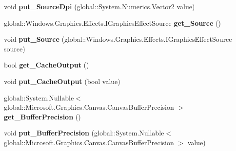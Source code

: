 \begin{DoxyCompactItemize}
void {\bfseries put\+\_\+\+Source\+Dpi} (global\+::\+System.\+Numerics.\+Vector2 value)
\item 
\mbox{\label{class_microsoft_1_1_graphics_1_1_canvas_1_1_effects_1_1_dpi_compensation_effect_ad4e3622fd4c21cbed4bbc30f5bca8e6c}} 
global\+::\+Windows.\+Graphics.\+Effects.\+I\+Graphics\+Effect\+Source {\bfseries get\+\_\+\+Source} ()
\item 
\mbox{\label{class_microsoft_1_1_graphics_1_1_canvas_1_1_effects_1_1_dpi_compensation_effect_a9757cf2afe58883b620d18466fa4301f}} 
void {\bfseries put\+\_\+\+Source} (global\+::\+Windows.\+Graphics.\+Effects.\+I\+Graphics\+Effect\+Source source)
\item 
\mbox{\label{class_microsoft_1_1_graphics_1_1_canvas_1_1_effects_1_1_dpi_compensation_effect_a7ec44257a5eb79a4b4d6ada66d09b56b}} 
bool {\bfseries get\+\_\+\+Cache\+Output} ()
\item 
\mbox{\label{class_microsoft_1_1_graphics_1_1_canvas_1_1_effects_1_1_dpi_compensation_effect_afde2778a436d181b229718ebd7d43df2}} 
void {\bfseries put\+\_\+\+Cache\+Output} (bool value)
\item 
\mbox{\label{class_microsoft_1_1_graphics_1_1_canvas_1_1_effects_1_1_dpi_compensation_effect_ad012672346bf689a6c4c6b8ea1a58331}} 
global\+::\+System.\+Nullable$<$ global\+::\+Microsoft.\+Graphics.\+Canvas.\+Canvas\+Buffer\+Precision $>$ {\bfseries get\+\_\+\+Buffer\+Precision} ()
\item 
\mbox{\label{class_microsoft_1_1_graphics_1_1_canvas_1_1_effects_1_1_dpi_compensation_effect_ad8bd2812bdcbdbfee9d0809f3c8ffe56}} 
void {\bfseries put\+\_\+\+Buffer\+Precision} (global\+::\+System.\+Nullable$<$ global\+::\+Microsoft.\+Graphics.\+Canvas.\+Canvas\+Buffer\+Precision $>$ value)
\item 
\mbox{\label{class_microsoft_1_1_graphics_1_1_canvas_1_1_effects_1_1_dpi_compensation_effect_a13bdf09687b3624e9a0f152aec43d911}} 

\end{DoxyCompactItemize}
